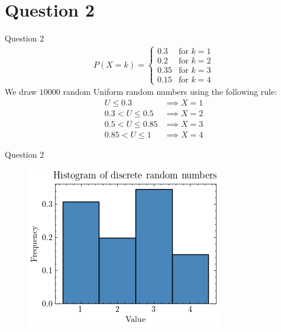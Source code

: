 \documentclass[compress,12pt]{beamer}
\begin{document}
\section{Question 2}
\begin{frame}{Question 2}
\small{
\begin{align*}
      P(X = k) = \begin{cases}
            0.3 & \text{for } k = 1 \\
            0.2 & \text{for } k = 2 \\
            0.35 & \text{for } k = 3 \\
            0.15 & \text{for } k = 4
      \end{cases}
\end{align*}
}
We draw $10000$ random Uniform random numbers using the following rule:
\begin{align*}
      U \leq 0.3 &\implies X = 1 \\
      0.3 < U \leq 0.5 &\implies X = 2 \\
      0.5 < U \leq 0.85 &\implies X = 3 \\
      0.85 < U \leq 1 &\implies X = 4
\end{align*}     
      
\end{frame}
\begin{frame}{Question 2}
\begin{figure}
            \centering
            \includegraphics[scale=0.6]{imgs/discrete.png}
\end{figure}
\end{frame}
\end{document}
